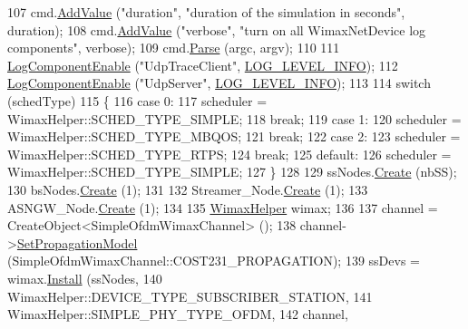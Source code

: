 \begin{DoxyCode}
107   cmd.\hyperlink{classns3_1_1CommandLine_addcfb546c7ad4c8bd0965654d55beb8e}{AddValue} (\textcolor{stringliteral}{"duration"}, \textcolor{stringliteral}{"duration of the simulation in seconds"}, duration);
108   cmd.\hyperlink{classns3_1_1CommandLine_addcfb546c7ad4c8bd0965654d55beb8e}{AddValue} (\textcolor{stringliteral}{"verbose"}, \textcolor{stringliteral}{"turn on all WimaxNetDevice log components"}, verbose);
109   cmd.\hyperlink{classns3_1_1CommandLine_a5c10b85b3207e5ecb48d907966923156}{Parse} (argc, argv);
110 
111   \hyperlink{namespacens3_adc4ef4f00bb2f5f4edae67fc3bc27f20}{LogComponentEnable} (\textcolor{stringliteral}{"UdpTraceClient"}, \hyperlink{namespacens3_aa6464a4d69551a9cc968e17a65f39bdbae36aedc880de94fd5a5b53bb9fe65628}{LOG\_LEVEL\_INFO});
112   \hyperlink{namespacens3_adc4ef4f00bb2f5f4edae67fc3bc27f20}{LogComponentEnable} (\textcolor{stringliteral}{"UdpServer"}, \hyperlink{namespacens3_aa6464a4d69551a9cc968e17a65f39bdbae36aedc880de94fd5a5b53bb9fe65628}{LOG\_LEVEL\_INFO});
113 
114   \textcolor{keywordflow}{switch} (schedType)
115     \{
116     \textcolor{keywordflow}{case} 0:
117       scheduler = WimaxHelper::SCHED\_TYPE\_SIMPLE;
118       \textcolor{keywordflow}{break};
119     \textcolor{keywordflow}{case} 1:
120       scheduler = WimaxHelper::SCHED\_TYPE\_MBQOS;
121       \textcolor{keywordflow}{break};
122     \textcolor{keywordflow}{case} 2:
123       scheduler = WimaxHelper::SCHED\_TYPE\_RTPS;
124       \textcolor{keywordflow}{break};
125     \textcolor{keywordflow}{default}:
126       scheduler = WimaxHelper::SCHED\_TYPE\_SIMPLE;
127     \}
128 
129   ssNodes.\hyperlink{classns3_1_1NodeContainer_a787f059e2813e8b951cc6914d11dfe69}{Create} (nbSS);
130   bsNodes.\hyperlink{classns3_1_1NodeContainer_a787f059e2813e8b951cc6914d11dfe69}{Create} (1);
131 
132   Streamer\_Node.\hyperlink{classns3_1_1NodeContainer_a787f059e2813e8b951cc6914d11dfe69}{Create} (1);
133   ASNGW\_Node.\hyperlink{classns3_1_1NodeContainer_a787f059e2813e8b951cc6914d11dfe69}{Create} (1);
134 
135   \hyperlink{classns3_1_1WimaxHelper}{WimaxHelper} wimax;
136 
137   channel = CreateObject<SimpleOfdmWimaxChannel> ();
138   channel->\hyperlink{classns3_1_1SimpleOfdmWimaxChannel_a1b502ad69b48d137a2938c708341a128}{SetPropagationModel} (SimpleOfdmWimaxChannel::COST231\_PROPAGATION);
139   ssDevs = wimax.\hyperlink{classns3_1_1WimaxHelper_a9f0848e09c4b6db9cdde9872b38f6349}{Install} (ssNodes,
140                           WimaxHelper::DEVICE\_TYPE\_SUBSCRIBER\_STATION,
141                           WimaxHelper::SIMPLE\_PHY\_TYPE\_OFDM,
142                           channel,

\end{DoxyCode}
